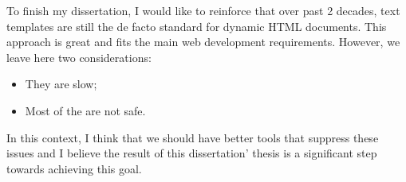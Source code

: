 \noindent
To finish my dissertation, I would like to reinforce that over past 2 decades, text templates are still the de facto standard for dynamic \ac{HTML} documents. This approach is great and fits the main web development requirements. However, we leave here two considerations:

\begin{itemize}
	\item They are slow;
	\item Most of the are not safe.
\end{itemize}

\noindent
In this context, I think that we should have better tools that suppress these issues and I believe the result of this dissertation' thesis is a significant step towards achieving this goal.